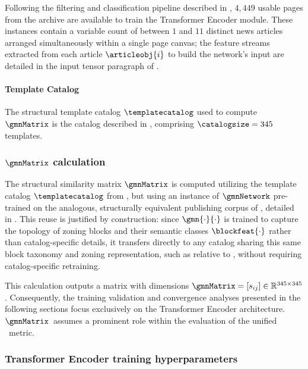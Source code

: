 Following the filtering and classification pipeline described in , $4,449$ usable pages from the \laprovence archive are available to train the Transformer Encoder module. These instances contain a variable count of between $1$ and $11$ distinct news articles arranged simultaneously within a single page canvas; the feature streams extracted from each article $\articleobj{i}$ to build the network's input are detailed in the input tensor paragraph of .

\paragraph{Template Catalog}

The structural template catalog $\templatecatalog$ used to compute $\gmnMatrix$ is the \laprovence catalog described in , comprising $\catalogsize = 345$ templates.


\subsubsection{$\gmnMatrix$ calculation}

The structural similarity matrix $\gmnMatrix$ is computed utilizing the template catalog $\templatecatalog$ from \laprovence, but using an instance of $\gmnNetwork$ pre-trained on the analogous, structurally equivalent publishing corpus of \publihebdos, detailed in . 
This reuse is justified by construction: since $\gmn{\cdot}{\cdot}$ is trained to capture the topology of zoning blocks and their semantic classes $\blockfeat{\cdot}$ rather than catalog-specific details, it transfers directly to any catalog sharing this same block taxonomy and zoning representation, such as \laprovence relative to \publihebdos, without requiring catalog-specific retraining.

This calculation outputs a matrix with dimensions $\gmnMatrix = [s_{ij}] \in \mathbb{R}^{345 \times 345}$. Consequently, the training validation and convergence analyses presented in the following sections focus exclusively on the Transformer Encoder architecture. $\gmnMatrix$\  assumes a prominent role  within the evaluation of the unified \neuralmethod\ metric.


\subsubsection{Transformer Encoder training hyperparameters}
\label{subsec:hyperparameter_calibration_transformer}

